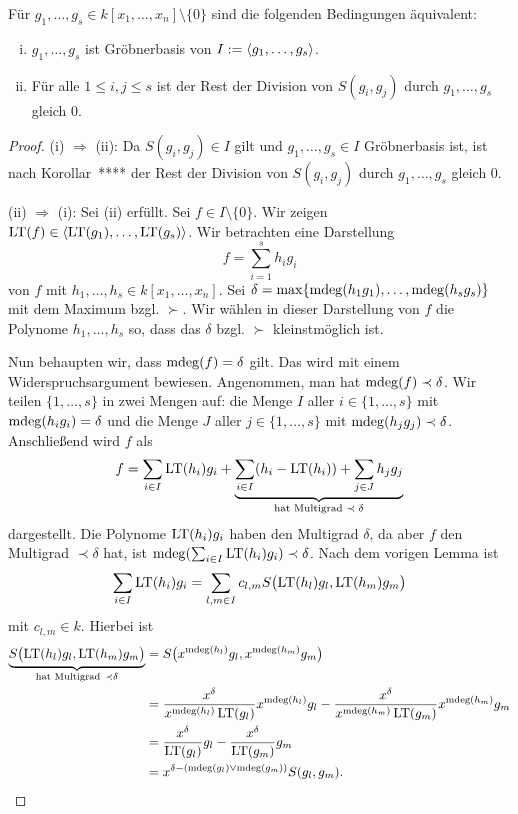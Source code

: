 \documentclass[11pt]{article}
\numberwithin{equation}{section}
\begin{document}
\begin{theorem} \label{s:krit}
	Für $g_1,\ldots,g_s \in k[x_1,\ldots,x_n] \setminus \{0\}$ sind die folgenden Bedingungen äquivalent: 
	\begin{enumerate}[(i)]
		\item $g_1,\ldots,g_s$ ist Gröbnerbasis von $I: = \left< g_1,\ldots,g_s \right>$. 
		\item Für alle $1 \le i,j \le s$ ist der Rest der Division von $S(g_i,g_j)$ durch $g_1,\ldots,g_s$ gleich $0$. 
	\end{enumerate} 
\end{theorem}
\begin{proof} 
	(i) $\Rightarrow$ (ii): Da $S(g_i,g_j) \in I$ gilt und $g_1,\ldots,g_s \in I$ Gröbnerbasis ist, ist nach Korollar~**** der Rest der Division von $S(g_i,g_j)$ durch $g_1,\ldots,g_s$ gleich $0$. 
	
	(ii) $\Rightarrow$ (i): Sei (ii) erfüllt. Sei $f \in I \setminus \{0\}$. Wir zeigen  $\operatorname{LT}(f) \in \left< \operatorname{LT}(g_1),\ldots, \operatorname{LT}(g_s) \right>$. Wir betrachten eine Darstellung 
	\[
		f = \sum_{i=1}^s h_i g_i
	\]
	von $f$ mit $h_1,\ldots, h_s \in k[x_1,\ldots,x_n]$. Sei $\delta =  \max \{ \operatorname{mdeg}(h_1 g_1) ,\ldots, \operatorname{mdeg}(h_s g_s) \}$ mit dem Maximum bzgl. $\succ$. Wir wählen in dieser Darstellung von $f$ die Polynome  $h_1,\ldots,h_s$ so, dass das $\delta$ bzgl. $\succ$ kleinstmöglich ist. 
	
	Nun behaupten wir, dass $\operatorname{mdeg}(f) = \delta$ gilt. Das wird mit einem Widerspruchsargument bewiesen. Angenommen, man hat $\operatorname{mdeg}(f) \prec \delta$. Wir teilen $\{1,\ldots, s\}$ in zwei Mengen auf: die Menge $I$ aller $i \in \{1,\ldots,s\}$ mit $\operatorname{mdeg}(h_i g_i) = \delta$ und die Menge $J$ aller $j \in \{1,\ldots,s\}$ mit $\operatorname{mdeg}(h_j g_j ) \prec \delta$. Anschließend wird $f$ als 
	\[
		f = \sum_{i \in I} \operatorname{LT}(h_i) g_i +  \underbrace{\sum_{i \in I} (h_i - \operatorname{LT}(h_i)) + \sum_{j \in J} h_j g_j}_{\text{hat Multigrad $\prec \delta$}} 
	\]
	dargestellt. Die Polynome $\operatorname{LT}(h_i) g_i$ haben den Multigrad $\delta$, da aber $f$ den Multigrad $\prec \delta$ hat, ist $\operatorname{mdeg}( \sum_{i \in I} \operatorname{LT}(h_i) g_i) \prec \delta$. Nach dem vorigen Lemma ist 
	\[
		\sum_{i \in I} \operatorname{LT}(h_i) g_i = \sum_{l,m \in I } c_{l,m} S \bigl(\operatorname{LT}(h_l) g_l, \operatorname{LT}(h_m) g_m \bigr) 
	\]
	mit $c_{l,m} \in k$. Hierbei ist 
	\begin{align*}
		\underbrace{S \bigl(\operatorname{LT}(h_l) g_l, \operatorname{LT}(h_m) g_m\bigr)}_{\text{hat Multigrad} \  \prec \delta} & = S \bigl( x^{\operatorname{mdeg}(h_l)} g_l, x^{\operatorname{mdeg}(h_m)} g_m \bigr) 
		\\ & = \frac{x^\delta} {x^{\operatorname{mdeg}(h_l)} \operatorname{LT}(g_l)} x^{\operatorname{mdeg}(h_l)} g_l - \frac{x^\delta} {x^{\operatorname{mdeg}(h_m)} \operatorname{LT}(g_m)} x^{\operatorname{mdeg}(h_m)} g_m 
		\\ & = \frac{x^\delta} { \operatorname{LT}(g_l)}  g_l - \frac{x^\delta} { \operatorname{LT}(g_m)}  g_m 
		\\ & = x^{\delta - (\operatorname{mdeg}(g_l) \vee \operatorname{mdeg}(g_m))} S(g_l, g_m). 
	\end{align*}
	

\end{proof}
\end{document}
